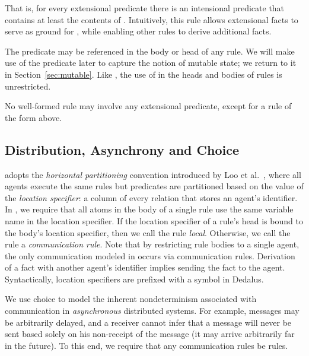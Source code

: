 
\noindent{}That is, for every extensional predicate  there is an intensional
predicate  that contains at least the contents of .
Intuitively, this rule allows extensional facts to serve as ground for
, while enabling other rules to derive additional  facts.

The predicate  may be referenced in the body or head of any \lang rule.  
We will make use of the predicate  later to capture the notion of mutable state; we return to it in Section~\ref{sec:mutable}. 
Like , the use of  in the heads and bodies of rules is unrestricted.

\vspace{1.2em}
No well-formed \lang rule may involve any extensional predicate, except for a rule of the form above.


\subsection{Distribution, Asynchrony and Choice}

\lang adopts the {\em horizontal partitioning} convention introduced by Loo et
al.~\cite{Loo:2005}, where all agents execute the same rules but predicates are
partitioned based on the value of the {\em location specifier}: a column of
every relation that stores an agent's identifier. In \lang, we require that all
atoms in the body of a single rule use the same variable name in the location
specifier. If the location specifier of a rule's head is bound to the body's
location specifier, then we call the rule {\em local}.  Otherwise, we call the
rule a {\em communication rule}.  Note that by restricting rule bodies to a
single agent, the only communication modeled in \lang occurs via communication
rules.  Derivation of a fact with another agent's identifier implies sending
the fact to the agent.  Syntactically, location specifiers are prefixed with a
\dedalus{\#} symbol in Dedalus.

We use choice to model the inherent nondeterminism associated with
communication in {\em asynchronous} distributed systems.  For example, messages
may be arbitrarily delayed, and a receiver cannot infer that a message will
never be sent based solely on his non-receipt of the message (it may arrive
arbitrarily far in the future).
To this end, we require that any communication rules be  rules.

